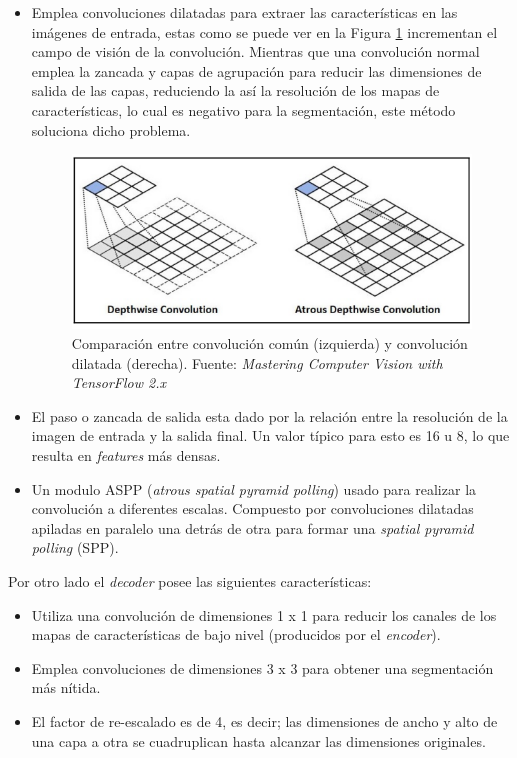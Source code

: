 \begin{itemize}
    \item Emplea convoluciones dilatadas para extraer las características en las imágenes de entrada, estas como se puede ver en la Figura \ref{dilated_convolution} incrementan el campo de visión de la convolución. Mientras que una convolución normal emplea la zancada y capas de agrupación para reducir las dimensiones de salida de las capas, reduciendo la así la resolución de los mapas de características, lo cual es negativo para la segmentación, este método soluciona dicho problema. 
    \begin{figure}[H]
        \centering
        \includegraphics[scale=0.6]{Recursos/atrous_convolution.png}
        \caption[Comparación entre convolución común (izquierda) y convolución dilatada (derecha).]{Comparación entre convolución común (izquierda) y convolución dilatada (derecha). {\footnotesize Fuente: \textit{Mastering Computer Vision with TensorFlow 2.x} \cite[p~219]{Krishnendu}}}
        \label{dilated_convolution}
    \end{figure}
    \item El paso o zancada de salida esta dado por la relación entre la resolución de la imagen de entrada y la salida final. Un valor típico para esto es 16 u 8, lo que resulta en \textit{features} más densas.
    \item Un modulo ASPP (\textit{atrous spatial pyramid polling}) usado para realizar la convolución a diferentes escalas. Compuesto por convoluciones dilatadas apiladas en paralelo una detrás de otra para formar una \textit{spatial pyramid polling} (SPP).  
\end{itemize}
Por otro lado el \textit{decoder} posee las siguientes características:
\begin{itemize}
    \item Utiliza una convolución de dimensiones 1 x 1 para reducir los canales de los mapas de características de bajo nivel (producidos por el \textit{encoder}).
    \item Emplea convoluciones de dimensiones 3 x 3 para obtener una segmentación más nítida.
    \item El factor de re-escalado es de 4, es decir; las dimensiones de ancho y alto de una capa a otra se cuadruplican hasta alcanzar las dimensiones originales.
\end{itemize}
